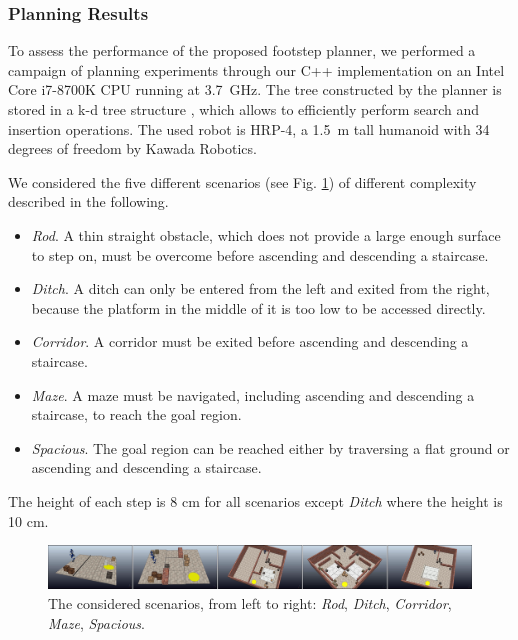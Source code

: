 \subsubsection{Planning Results}
\label{sec:WoS:offlineCase:FP:PlanningResults}

To assess the performance of the proposed footstep planner, we performed a campaign of planning experiments through our C++ implementation on an Intel Core i7-8700K CPU running at 3.7~GHz.
The tree constructed by the planner is stored in a k-d tree structure \cite{Yershova2007ImprovingMotionPlanning}, which allows to efficiently perform search and insertion operations.
The used robot is HRP-4, a 1.5~m tall humanoid with 34 degrees of freedom
by Kawada Robotics.




We considered the five different scenarios (see Fig. \ref{fig:WoS:Scenarios}) of different complexity described in the following.
\begin{itemize}
    \item \textit{Rod}. A thin straight obstacle, which does not provide a large enough surface to step on, must be overcome before ascending and descending a staircase. 
    \item \textit{Ditch}. A ditch can only be entered from the left and exited from the right, because the platform in the middle of it is too low to be accessed directly.
    \item \textit{Corridor}. A corridor must be exited before ascending and descending a staircase. 
    \item \textit{Maze}. A maze must be navigated, including ascending and descending a staircase, to reach the goal region.
    \item \textit{Spacious}. The goal region can be reached either by traversing a flat ground or ascending and descending a staircase.
\end{itemize}

The height of each step is 8 cm for all scenarios except \textit{Ditch} where the height is 10 cm. 

\begin{figure}
\centering
\includegraphics[width=\textwidth]{figures/PlanningScenarios.png}
\caption{The considered scenarios, from left to right: \textit{Rod}, \textit{Ditch}, \textit{Corridor}, \textit{Maze}, \textit{Spacious}.}
\label{fig:WoS:Scenarios}
\end{figure}


